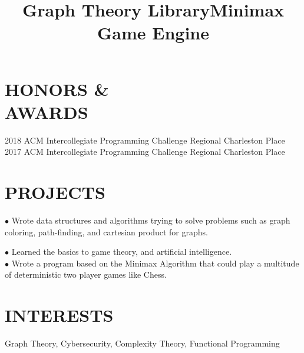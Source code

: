 \documentclass[margin]{res}
\begin{document}
\begin{resume}
\section{HONORS \&\\AWARDS}
2018 ACM Intercollegiate Programming Challenge Regional Charleston  Place\\
2017 ACM Intercollegiate Programming Challenge Regional Charleston  Place
\section{PROJECTS}
\location{}
\title{\textbf{Graph Theory Library}}
\begin{position}
$\bullet$ Wrote data structures and algorithms trying to solve problems such as graph coloring, path-finding, and cartesian product for graphs.
\end{position}

\title{\textbf{Minimax Game Engine}}
\begin{position}
$\bullet$ Learned the basics to game theory, and artificial intelligence.\\
$\bullet$ Wrote a program based on the Minimax Algorithm that could play a multitude of deterministic two player games like Chess.
\end{position}

\section{INTERESTS}
Graph Theory, Cybersecurity, Complexity Theory, Functional Programming
\end{resume}
\end{document}

